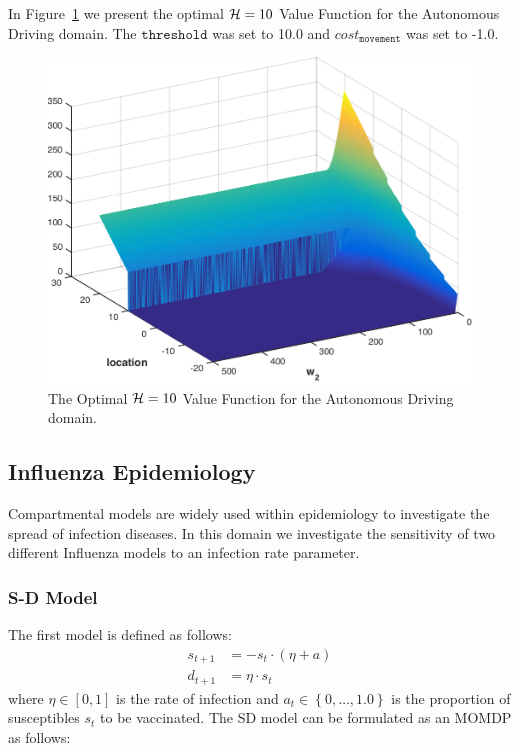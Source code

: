 In Figure~\ref{fig:vehicle1d} we present the optimal $ \mathcal{H} = 10 $ Value Function for the Autonomous Driving domain. The $ \mathtt{threshold} $ was set to 10.0 and $ cost_{\mathtt{movement}} $ was set to -1.0.

\begin{figure}[h!]
    \centering
    \includegraphics[width=0.9\linewidth, height=0.8\linewidth]{images/robot1d}
    \caption{The Optimal $ \mathcal{H} = 10 $ Value Function for the Autonomous Driving domain. }
    \label{fig:vehicle1d}
\end{figure}

\subsection{Influenza Epidemiology}
\label{sec:results_sd}

Compartmental models are widely used within epidemiology to investigate the spread of infection diseases. In this domain we investigate the sensitivity of two different Influenza models to an infection rate parameter. 

\subsubsection{S-D Model}

The first model is defined as follows:
\begin{align*}
    s_{t + 1} &= - s_t \cdot ( \eta + a ) \\
    d_{t+1} &= \eta \cdot s_t 
\end{align*}
where {\footnotesize $ \eta \in [0, 1]$} is the rate of infection and {\footnotesize $ a_t \in \left\lbrace 0, \ldots, 1.0\right\rbrace $} is the proportion of susceptibles {\footnotesize $ s_t $} to be vaccinated. The SD model can be formulated as an MOMDP as follows:

